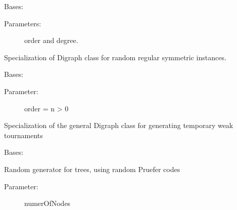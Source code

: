 \documentclass[letterpaper,10pt,english]{sphinxmanual}
\begin{document}

\begin{fulllineitems}
\label{techDoc:digraphs.RandomRegularDigraph}
Bases: {\hyperref[techDoc:digraphs.Digraph]{}}
\begin{description}
\item[{Parameters:}] \leavevmode
order and degree.

\end{description}

Specialization of Digraph class for random regular symmetric instances.

\end{fulllineitems}


\begin{fulllineitems}
\label{techDoc:digraphs.RandomTournament}
Bases: {\hyperref[techDoc:digraphs.Digraph]{}}
\begin{description}
\item[{Parameter:}] \leavevmode
order = n \textgreater{} 0

\end{description}

Specialization of the general Digraph class for generating
temporary weak tournaments

\end{fulllineitems}


\begin{fulllineitems}
\label{techDoc:digraphs.RandomTree}
Bases: {\hyperref[techDoc:digraphs.Digraph]{}}

Random generator for trees, using random Pruefer codes
\begin{description}
\item[{Parameter:}] \leavevmode
numerOfNodes

\end{description}

\begin{fulllineitems}
\label{techDoc:digraphs.RandomTree.prufer_to_tree}
\end{fulllineitems}


\end{fulllineitems}
\end{document}
